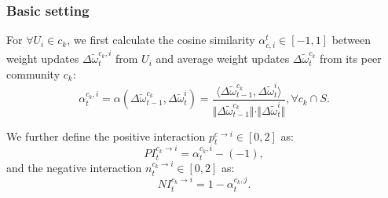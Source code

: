 \documentclass[lettersize,journal]{IEEEtran}
\begin{document}
\subsubsection{Basic setting}
For $\forall U_i \in c_k$, we first calculate the cosine similarity $\alpha_{c,i}^{t} \in [-1,1]$ between weight updates $\Delta\widetilde{\omega}^{c_k, i}_{t}$ from $U_i$ and average weight updates $\Delta\widetilde{\omega}^{c_k}_{t}$ from its peer community $c_k$:
\begin{equation}
    	  \alpha^{c_k,i}_{t} = \alpha( \Delta\widetilde{\omega}^{c_k}_{t-1}, \Delta\widetilde{\omega}^{i}_{t}) = \frac{\langle \Delta\widetilde{\omega}^{c_k}_{t-1},\Delta\widetilde{\omega}^{i}_{t}\rangle}{\Vert \Delta\widetilde{\omega}^{c_k}_{t-1}\Vert\cdot\Vert \Delta\widetilde{\omega}^{i}_{t}\Vert },\forall c_k \cap S.
\end{equation}

We further define the positive interaction $p^{c \rightarrow i}_{t} \in [0,2]$ as:
\begin{equation}
    	 PI^{c_k \rightarrow i}_{t} = \alpha^{c_k,i}_{t} -(-1),
\end{equation}
and the negative interaction $n^{c_k \rightarrow i}_{t} \in [0,2]$ as:
\begin{equation}
    	 NI^{c_k \rightarrow i}_{t} = 1-\alpha^{c_k,j}_{t}.
\end{equation}
\end{document}
